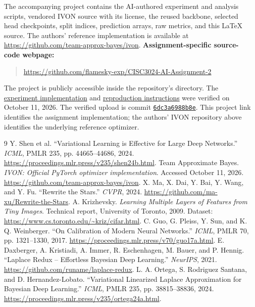\documentclass[11pt,a4paper]{article}
\begin{document}
The accompanying project contains the AI-authored experiment and analysis scripts,
vendored IVON source with its license, the reused backbone, selected head
checkpoints, split indices, prediction arrays, raw metrics, and this LaTeX source.
The authors' reference implementation is available at
\url{https://github.com/team-approx-bayes/ivon}.
\textbf{Assignment-specific source-code webpage:}
\begin{quote}\small
\url{https://github.com/flamesky-exp/CISC3024-AI-Assignment-2}
\end{quote}
The project is publicly accessible inside the repository's
 directory. The
\href{https://github.com/flamesky-exp/CISC3024-AI-Assignment-2/blob/main/IVON_StarNet_Assignment2/scripts/experiment.py}{experiment implementation}
and
\href{https://github.com/flamesky-exp/CISC3024-AI-Assignment-2/blob/main/IVON_StarNet_Assignment2/README.md}{reproduction instructions}
were verified on October 11, 2026. The verified upload is commit
\href{https://github.com/flamesky-exp/CISC3024-AI-Assignment-2/commit/6dc3a6988b8e124418aa78b70b4c2c42b02c0fcd}{\texttt{6dc3a6988b8e}}.
This project link identifies the assignment implementation; the authors' IVON
repository above identifies the underlying reference optimizer.

\begin{thebibliography}{9}
 Y. Shen et al. ``Variational Learning is Effective for Large Deep
Networks.'' \emph{ICML}, PMLR 235, pp. 44665--44686, 2024.
\url{https://proceedings.mlr.press/v235/shen24b.html}.
 Team Approximate Bayes. \emph{IVON: Official PyTorch optimizer
implementation}. Accessed October 11, 2026.
\url{https://github.com/team-approx-bayes/ivon}.
 X. Ma, X. Dai, Y. Bai, Y. Wang, and Y. Fu. ``Rewrite the Stars.''
\emph{CVPR}, 2024. \url{https://github.com/ma-xu/Rewrite-the-Stars}.
 A. Krizhevsky. \emph{Learning Multiple Layers of Features from
Tiny Images}. Technical report, University of Toronto, 2009.
Dataset: \url{https://www.cs.toronto.edu/~kriz/cifar.html}.
 C. Guo, G. Pleiss, Y. Sun, and K. Q. Weinberger. ``On Calibration
of Modern Neural Networks.'' \emph{ICML}, PMLR 70, pp. 1321--1330, 2017.
\url{https://proceedings.mlr.press/v70/guo17a.html}.
 E. Daxberger, A. Kristiadi, A. Immer, R. Eschenhagen,
M. Bauer, and P. Hennig. ``Laplace Redux -- Effortless Bayesian Deep Learning.''
\emph{NeurIPS}, 2021. \url{https://github.com/runame/laplace-redux}.
 L. A. Ortega, S. Rodriguez Santana, and D. Hernandez-Lobato.
``Variational Linearized Laplace Approximation for Bayesian Deep Learning.''
\emph{ICML}, PMLR 235, pp. 38815--38836, 2024.
\url{https://proceedings.mlr.press/v235/ortega24a.html}.
\end{thebibliography}
\end{document}
